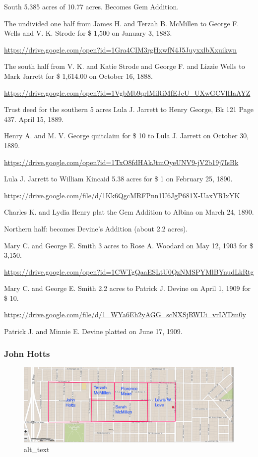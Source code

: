 \documentclass[
  12pt,
]{book}
\begin{document}
South 5.385 acres of 10.77 acres. Becomes Gem Addition.

The undivided one half from James H. and Terzah B. McMillen to George F. Wells and V. K. Strode for \$ 1,500 on January 3, 1883.

\url{https://drive.google.com/open?id=1Gra4CIM3rgHxwfN4J5JuyxxlbXxuikwn}

The south half from V. K. and Katie Strode and George F. and Lizzie Wells to Mark Jarrett for \$ 1,614.00 on October 16, 1888.

\url{https://drive.google.com/open?id=1VgbMb9qrlMiRiMfEJcU_UXwGCVlHaAYZ}

Trust deed for the southern 5 acres Lula J. Jarrett to Henry George, Bk 121 Page 437. April 15, 1889.

Henry A. and M. V. George quitclaim for \$ 10 to Lula J. Jarrett on October 30, 1889.

\url{https://drive.google.com/open?id=1TxO8fdHAkJtmOyeUNV9-jV2b19j7IsBk}

Lula J. Jarrett to William Kincaid 5.38 acres for \$ 1 on February 25, 1890.

\href{https://drive.google.com/file/d/1Kk6QgcMRFPnn1U6JgP681X-UaxYRIxYK/view?usp=sharing}{https://drive.google.com/file/d/1Kk6QgcMRFPnn1U6JgP681X-UaxYRIxYK}

Charles K. and Lydia Henry plat the Gem Addition to Albina on March 24, 1890.

Northern half: becomes Devine's Addition (about 2.2 acres).

Mary C. and George E. Smith 3 acres to Rose A. Woodard on May 12, 1903 for \$ 3,150.

\url{https://drive.google.com/open?id=1CWTgQaaESLtU0QzNMSPYMlBYnudLkRtg}

Mary C. and George E. Smith 2.2 acres to Patrick J. Devine on April 1, 1909 for \$ 10.

\href{https://drive.google.com/file/d/1_WYa6Eh2yAGG_scNXSjRWUi_vrLYDm0y/view?usp=sharing}{https://drive.google.com/file/d/1\_WYa6Eh2yAGG\_scNXSjRWUi\_vrLYDm0y}

Patrick J. and Minnie E. Devine platted on June 17, 1909.

\hypertarget{john-hotts}{%
\subsubsection{John Hotts}\label{john-hotts}}

\begin{figure}
\centering
\includegraphics{images/0202a_images/image9.png}
\caption{alt\_text}
\end{figure}
\end{document}
